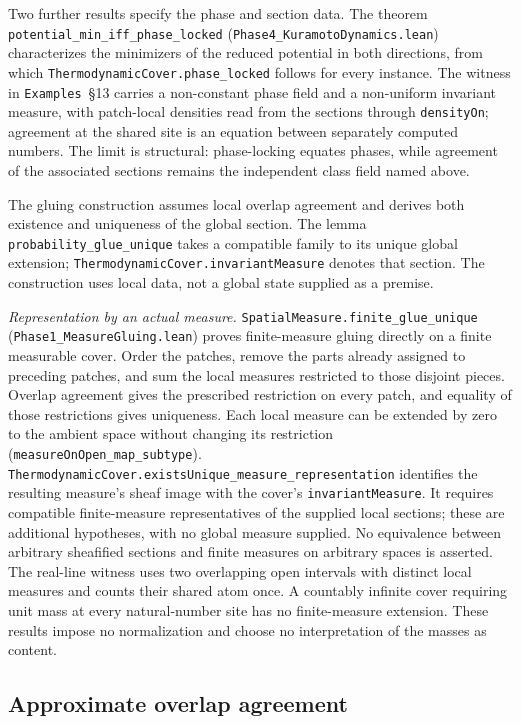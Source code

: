 \documentclass{article}
\begin{document}
Two further results specify the phase and section data. The theorem \nolinkurl{potential_min_iff_phase_locked} (\nolinkurl{Phase4_KuramotoDynamics.lean}) characterizes the minimizers of the reduced potential in both directions, from which \nolinkurl{ThermodynamicCover.phase_locked} follows for every instance. The witness in \texttt{Examples}~\S13 carries a non-constant phase field and a non-uniform invariant measure, with patch-local densities read from the sections through \texttt{densityOn}; agreement at the shared site is an equation between separately computed numbers. The limit is structural: phase-locking equates phases, while agreement of the associated sections remains the independent class field named above.

The gluing construction assumes local overlap agreement and derives both existence and uniqueness of the global section. The lemma \nolinkurl{probability_glue_unique} takes a compatible family to its unique global extension; \texttt{ThermodynamicCover.invariantMeasure} denotes that section. The construction uses local data, not a global state supplied as a premise.

\textit{Representation by an actual measure.}
\nolinkurl{SpatialMeasure.finite_glue_unique}
(\nolinkurl{Phase1_MeasureGluing.lean}) proves finite-measure gluing
directly on a finite measurable cover. Order the patches, remove the parts
already assigned to preceding patches, and sum the local measures restricted
to those disjoint pieces. Overlap agreement gives the prescribed restriction
on every patch, and equality of those restrictions gives uniqueness. Each
local measure can be extended by zero to the ambient space without changing
its restriction (\nolinkurl{measureOnOpen_map_subtype}).
\nolinkurl{ThermodynamicCover.existsUnique_measure_representation}
identifies the resulting measure's sheaf image with the cover's
\texttt{invariantMeasure}. It requires compatible finite-measure representatives
of the supplied local sections; these are additional hypotheses, with no
global measure supplied. No equivalence between arbitrary sheafified sections
and finite measures on arbitrary spaces is asserted. The real-line witness
uses two overlapping open intervals with distinct local measures and counts
their shared atom once. A countably infinite cover requiring unit mass at
every natural-number site has no finite-measure extension. These results
impose no normalization and choose no interpretation of the masses as content.

\subsection{Approximate overlap agreement}
\label{sec:approx-gluing}
\end{document}
